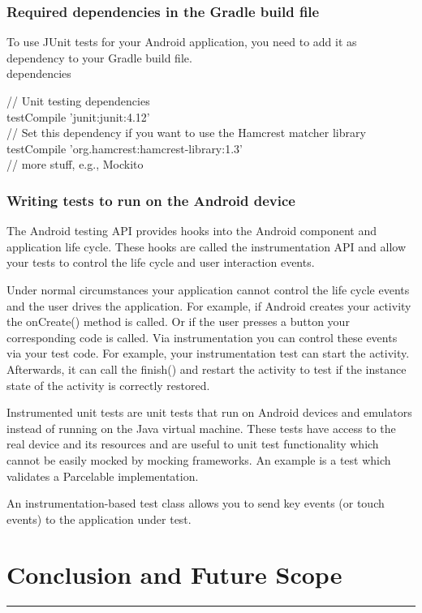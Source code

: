 \subsection{Required dependencies in the Gradle build file}
To use JUnit tests for your Android application, you need to add it as dependency to your Gradle build file.\\
dependencies {
	// Unit testing dependencies\\
	testCompile 'junit:junit:4.12'\\
	// Set this dependency if you want to use the Hamcrest matcher library\\
	testCompile 'org.hamcrest:hamcrest-library:1.3'\\
	// more stuff, e.g., Mockito\\
\subsection{Writing tests to run on the Android device}
The Android testing API provides hooks into the Android component and application life cycle. These hooks are called the instrumentation API and allow your tests to control the life cycle and user interaction events.

Under normal circumstances your application cannot control the life cycle events and the user drives the application. For example, if Android creates your activity the onCreate() method is called. Or if the user presses a button your corresponding code is called. Via instrumentation you can control these events via your test code. For example, your instrumentation test can start the activity. Afterwards, it can call the finish() and restart the activity to test if the instance state of the activity is correctly restored.

Instrumented unit tests are unit tests that run on Android devices and emulators instead of running on the Java virtual machine. These tests have access to the real device and its resources and are useful to unit test functionality which cannot be easily mocked by mocking frameworks. An example is a test which validates a Parcelable implementation.

An instrumentation-based test class allows you to send key events (or touch events) to the application under test.	
}
\chapter{Conclusion and Future Scope}\hrule
\label{Chapter:5}
